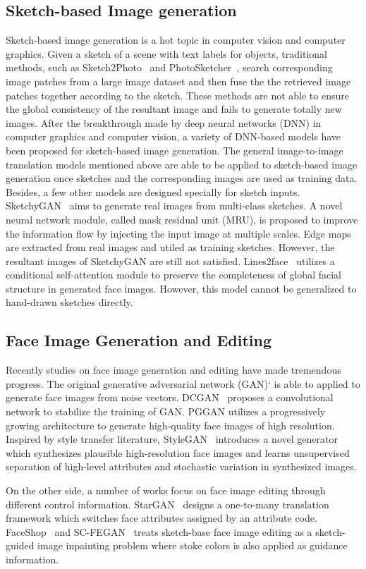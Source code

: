 \subsection{Sketch-based Image generation}
Sketch-based image generation is a hot topic in computer vision and computer graphics. Given a sketch of a scene with text labels for objects, traditional methods, such as Sketch2Photo~\cite{Sketch2Photo} and PhotoSketcher~\cite{PhotoSketcher}, search corresponding image patches from a large image dataset and then fuse the the retrieved image patches together according to the sketch. These methods are not able to ensure the global consistency of the resultant image and fails to generate totally new images.
%
After the breakthrough made by deep neural networks (DNN) in computer graphics and computer vision, a variety of DNN-based models have been proposed for sketch-based image generation. 
%
The general image-to-image translation models mentioned above are able to be applied to sketch-based image generation once sketches and the corresponding images are used as training data.
%
Besides, a few other models are designed specially for sketch inputs. SketchyGAN~\cite{SketchyGAN} aims to generate real images from multi-class sketches. A novel neural network module, called mask residual unit (MRU), is proposed to improve the information flow by injecting the input image at multiple scales. Edge maps are extracted from real images and utiled as training sketches. However, the resultant images of SketchyGAN are still not satisfied.
%
Lines2face~\cite{Lines2Face} utilizes a conditional self-attention module to preserve the completeness of global facial structure in generated face images.
However, this model cannot be generalized to hand-drawn sketches directly.

\subsection{Face Image Generation and Editing}

Recently studies on face image generation and editing have made tremendous progress. The original generative adversarial network (GAN)`\cite{GANs} is able to applied to generate face images from noise vectors.
%
DCGAN~\cite{DCGANs} proposes a convolutional network to stabilize the training of GAN.
PGGAN\cite{PGGAN} utilizes a progressively growing architecture to generate high-quality face images of high resolution.
Inspired by style transfer literature, StyleGAN~\cite{StyleGAN} introduces a novel generator which synthesizes plausible high-resolution face images and learns unsupervised separation of high-level attributes and stochastic variation in synthesized images. 

On the other side, a number of works focus on face image editing through different control information. StarGAN~\cite{StarGAN} designs a one-to-many translation framework which switches face attributes assigned by an attribute code. FaceShop~\cite{FaceShop} and SC-FEGAN~\cite{SC-FEGAN} treats sketch-base face image editing as a sketch-guided image inpainting problem where stoke colors is also applied as guidance information. 

